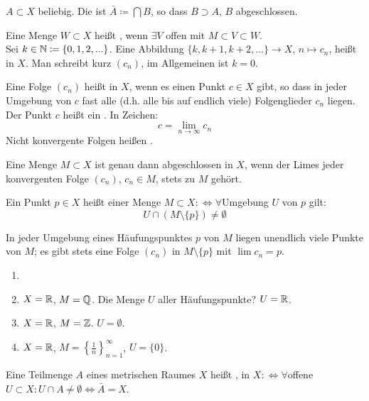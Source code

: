 \begin{definition}
$ A\subset X $ beliebig. Die  ist $ \bar A\coloneqq\bigcap B $, so dass $ B\supset A $, $ B $ abgeschlossen. 
\end{definition}
Eine Menge $ W\subset X $ hei\ss t , wenn $ \exists V $ offen mit $ M\subset V\subset W $.\\
Sei $ k\in\mathbb{N}\coloneqq\lbrace 0,1,2,...\rbrace $. Eine Abbildung $ \lbrace k,k+1,k+2,...\rbrace\rightarrow X $, $ n\mapsto c_n $, hei\ss t  in $ X $. Man schreibt kurz $ (c_n) $, im Allgemeinen ist $ k=0 $.
\newpage
\begin{definition}
Eine Folge $ (c_n) $ hei\ss t  in $ X $, wenn es einen Punkt $ c\in X $ gibt, so dass in jeder Umgebung von $ c $ fast alle (d.h. alle bis auf endlich viele) Folgenglieder $ c_n $ liegen. Der Punkt $ c $ hei\ss t ein . In Zeichen:
\[ c=\lim_{n\to\infty}c_n \]
Nicht konvergente Folgen hei\ss en . 
\end{definition}
Eine Menge $ M\subset X $ ist genau dann abgeschlossen in $ X $, wenn der Limes jeder konvergenten Folge $ (c_n) $, $ c_n\in M $, stets zu $ M $ geh\"ort.\\
\begin{definition}
Ein Punkt $ p\in X $ hei\ss t  einer Menge $ M\subset X :\Leftrightarrow\forall $Umgebung $ U $ von $ p $ gilt:
\[ U\cap (M\setminus\lbrace p\rbrace)\neq\emptyset \]
\end{definition}
In jeder Umgebung eines H\"aufungspunktes $ p $ von $ M $ liegen unendlich viele Punkte von $ M $; es gibt stets eine Folge $ (c_n) $ in $ M\setminus\lbrace p\rbrace $ mit $ \lim c_n=p $.
\begin{beispiel*}
\begin{enumerate}
\item[]
\item $ X=\mathbb{R} $, $ M=\mathbb{Q} $. Die Menge $ U $ aller H\"aufungspunkte? $ U=\mathbb{R} $.
\item $ X=\mathbb{R} $, $ M=\mathbb{Z} $. $ U = \emptyset $.
\item $ X=\mathbb{R} $, $ M=\left\lbrace\frac{1}{n}\right\rbrace_{n=1}^\infty $, $ U=\lbrace 0\rbrace $.
\end{enumerate}
\end{beispiel*}
\begin{definition}
Eine Teilmenge $ A $ eines metrischen Raumes $ X $ hei\ss t , in $ X:\Leftrightarrow\forall $offene $ U\subset X: U\cap A\neq\emptyset \Leftrightarrow\bar A=X$.
\end{definition}
